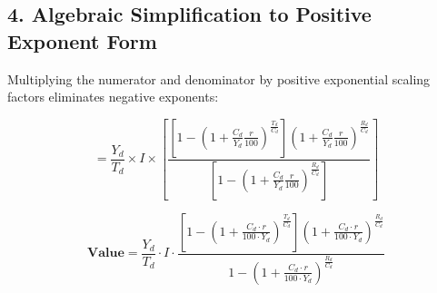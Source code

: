 \documentclass[11pt,a4paper]{article}
\begin{document}
\subsection*{4. Algebraic Simplification to Positive Exponent Form}
Multiplying the numerator and denominator by positive exponential scaling factors eliminates negative exponents:

\begin{equation}
= \frac{Y_d}{T_d} \times I \times \left[ \frac{\left[ 1 - \left(1 + \frac{C_d}{Y_d} \frac{r}{100}\right)^{\frac{T_d}{C_d}} \right] \left(1 + \frac{C_d}{Y_d} \frac{r}{100}\right)^{\frac{R_d}{C_d}}}{\left[ 1 - \left(1 + \frac{C_d}{Y_d} \frac{r}{100}\right)^{\frac{R_d}{C_d}} \right]} \right]
\end{equation}

\vspace{1.5em}

\begin{tcolorbox}[colback=bglight,colframe=primary,title=\textbf{Final Typeset Closed-Form Result}]
\[
\mathbf{\text{Value}} = \frac{Y_d}{T_d} \cdot I \cdot \frac{\left[ 1 - \left(1 + \frac{C_d \cdot r}{100 \cdot Y_d}\right)^{\frac{T_d}{C_d}} \right] \left(1 + \frac{C_d \cdot r}{100 \cdot Y_d}\right)^{\frac{R_d}{C_d}}}{1 - \left(1 + \frac{C_d \cdot r}{100 \cdot Y_d}\right)^{\frac{R_d}{C_d}}}
\]
\end{tcolorbox}
\end{document}

